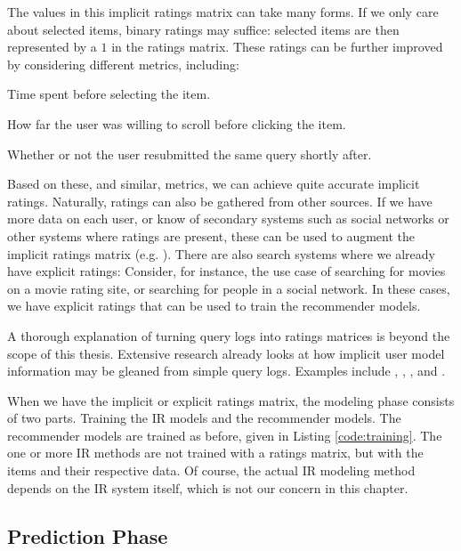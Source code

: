 The values in this implicit ratings matrix can take many forms.
If we only care about selected items, binary ratings may suffice:
selected items are then represented by a $1$ in the ratings matrix.
These ratings can be further improved by considering different metrics, including:

\begin{itemize*}
  \item Time spent before selecting the item.
  \item How far the user was willing to scroll before clicking the item.
  \item Whether or not the user resubmitted the same query shortly after.
\end{itemize*}

Based on these, and similar, metrics, we can achieve quite accurate implicit ratings.
Naturally, ratings can also be gathered from other sources.
If we have more data on each user, or know of secondary systems such as social networks
or other systems where ratings are present, these can be used to augment the implicit ratings matrix
(e.g. \cite{Carmel2009}).
There are also search systems where we already have explicit ratings:
Consider, for instance, the use case of searching for movies on a movie rating site,
or searching for people in a social network.
In these cases, we have explicit ratings that can be used to train the recommender models.

A thorough explanation of turning query logs into ratings matrices
is beyond the scope of this thesis. Extensive research already
looks at how implicit user model information may be gleaned
from simple query logs. Examples include \cite{Joachims2007},
\cite{Lee2005}, \cite{Agichtein2006}, \cite{Mobasher} and
\cite{Speretta2000}.

When we have the implicit or explicit ratings matrix, the modeling phase
consists of two parts. Training the IR models and the recommender models.
The recommender models are trained as before, given in Listing \ref{code:training}.
The one or more IR methods are not trained with a ratings matrix,
but with the items and their respective data.
Of course, the actual IR modeling method depends on the IR system itself,
which is not our concern in this chapter.


\subsection{Prediction Phase}

